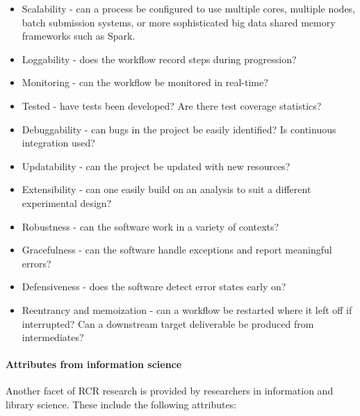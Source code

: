 \documentclass{drexelthesis}
\begin{document}
\begin{itemize}
	\item Scalability - can a process be configured to use multiple cores, multiple nodes, batch submission systems, or more sophisticated big data shared memory frameworks such as Spark.

	\item Loggability - does the workflow record steps during progression?

	\item Monitoring - can the workflow be monitored in real-time?

	\item Tested - have tests been developed? Are there test coverage statistics?

	\item Debuggability - can bugs in the project be easily identified? Is continuous integration used?

	\item Updatability - can the project be updated with new resources?

	\item Extensibility - can one easily build on an analysis to suit a different experimental design?

	\item Robustness - can the software work in a variety of contexts?

	\item Gracefulness - can the software handle exceptions and report meaningful errors?

	\item Defensiveness - does the software detect error states early on?

	\item Reentrancy and memoization - can a workflow be restarted where it left off if interrupted? Can a downstream target deliverable be produced from intermediates?

\end{itemize}
\paragraph{Attributes from information science}

Another facet of RCR research is provided by researchers in information and library science. These include the following attributes:
\end{document}
